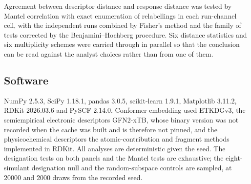 \documentclass[journal=jacsat,manuscript=article,margin=1in]{achemso}
\begin{document}
Agreement between descriptor distance and response distance was tested by
Mantel correlation with exact enumeration of relabellings in each run-channel
cell, with the independent runs combined by Fisher's method and the family of
tests corrected by the Benjamini--Hochberg procedure. Six distance statistics
and six multiplicity schemes were carried through in parallel so that the
conclusion can be read against the analyst choices rather than from one of
them.

\subsection{Software}
NumPy 2.5.3,\cite{numpy2020} SciPy 1.18.1,\cite{scipy2020} pandas
3.0.5,\cite{mckinney2010} scikit-learn 1.9.1,\cite{sklearn2011} Matplotlib
3.11.2,\cite{matplotlib2007} RDKit 2026.03.6\cite{rdkit} and PySCF
2.14.0.\cite{pyscf2018} Conformer embedding used
ETKDGv3,\cite{riniker2015,wang2020} the semiempirical electronic
descriptors GFN2-xTB,\cite{gfnxtb2017,bannwarth2019} whose binary version was
not recorded when the cache was built and is therefore not pinned, and the
physicochemical
descriptors the atomic-contribution and fragment methods implemented in
RDKit.\cite{wildman1999,ertl2000} All analyses are deterministic given the
seed. The designation tests on both panels and the Mantel tests are
exhaustive; the eight-simulant designation null and the random-subspace
controls are sampled, at 20000 and 2000 draws from the recorded seed.
\end{document}

